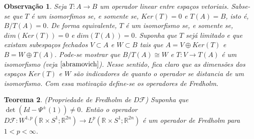 \documentclass[12pt]{book}
\newtheorem{teorema}{Teorema}[section]
\newtheorem{observacao}[teorema]{Observação}
\newcommand{\circulo}{S^{1}}
\newcommand{\diferencialfloer}{D\operadorFloer}
\newcommand{\espacoLpcontradominio}[2]{L^{p}(#1;#2)}
\newcommand{\espacoLpretacirculo}{\espacoLpcontradominio{\retacartesianocirculo}{\real{2n}}}
\newcommand{\espacosobolevcontradominio}[2]{W^{1,p}(#1;#2)}
\newcommand{\espacosobolevretacirculo}{\espacosobolevcontradominio{\retacartesianocirculo}{\real{2n}}}
\newcommand{\operadorFloer}{\mathcal{F}}
\newcommand{\retacartesianocirculo}{\real{} \times \circulo}
\newcommand{\real}[1]{\mathbb{R}^{#1}}
\begin{document}
	\begin{observacao}
		Seja $T:A\to B$ um operador linear entre espaços vetoriais. Sabse-se que $T$ é um isomorfimos se, e somente se, $Ker(T) = 0$ e $T(A) = B$, isto é, $B/T(A) = 0$. De forma equivalente, $T$ é um isomorfismo se, e somente se, $dim(Ker(T)) = 0$ e $dim(T(A)) = 0$. Suponha que $T$ sejá limitado e que existam subespaços fechados $V \subset A$ e $W \subset B$ tais que $A=V\oplus Ker(T)$ e $B=W\oplus T(A)$. Pode-se mostrar que $B/T(A) \cong W$ e $T:V \to T(A)$ é um isomorfismo (veja $\cite{abramovich}$). Nesse sentido, fica claro que as dimensões dos espaços $Ker(T)$ e $W$ são indicadores de quanto o operador se distancia de um isomorfismo. Com essa motivação define-se os operadores de Fredholm.
	\end{observacao}
	
	\begin{teorema}
		(Propriedade de Fredholm de $\diferencialfloer$) Suponha que $\det(Id - \Psi^{\pm}(1)) \neq 0$. Então o operador $\diferencialfloer: \espacosobolevretacirculo\to \espacoLpretacirculo$ é um operador de Fredholm para $1<p<\infty$.
	\end{teorema}
\end{document}
